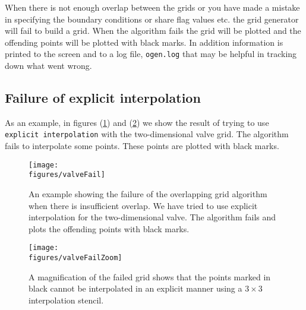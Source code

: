 \documentclass[xcolor=rgb,svgnames,dvipsnames]{article}
\newcommand{\figures}{\homeHenshaw/OvertureFigures}
\begin{document}
When there is not enough overlap between the grids or you have made a
mistake in specifying the boundary conditions or share flag values
etc. the grid generator will fail to build a grid. When the algorithm
fails the grid will be plotted and the offending points will be
plotted with black marks. In addition information is printed to the
screen and to a log file, {\tt ogen.log} that may be helpful in tracking down what
went wrong.

\subsection{Failure of explicit interpolation}

As an example, in figures (\ref{fig:valveFail}) and  (\ref{fig:valveFailZoom})
we show the result of trying
to use {\tt explicit interpolation} with the two-dimensional valve grid. The algorithm fails
to interpolate some points. These points are plotted with black marks.

\begin{figure}[hbt]
  \begin{center}
   \texttt{[image: \\figures/valveFail]}
  \caption{An example showing the failure of the overlapping grid algorithm when there is insufficient 
     overlap. We have tried to use explicit interpolation for the two-dimensional valve. The algorithm
      fails and plots the offending points with black marks.} \label{fig:valveFail}
  \end{center}
\end{figure}
\begin{figure}[hbt]
  \begin{center}
   \texttt{[image: \\figures/valveFailZoom]}
  \caption{A magnification of the failed grid shows that the points marked in black cannot be interpolated
     in an explicit manner using a $3\times3$ interpolation stencil.} \label{fig:valveFailZoom}
  \end{center}
\end{figure}
\end{document}
